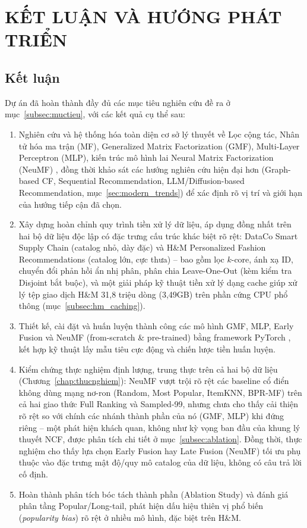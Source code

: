 \chapter{KẾT LUẬN VÀ HƯỚNG PHÁT TRIỂN}
\label{chap:ketluan}

\section{Kết luận}
\label{sec:ketluan}

Dự án đã hoàn thành đầy đủ các mục tiêu nghiên cứu đề ra ở mục~\ref{subsec:muctieu}, với các kết quả cụ thể sau:
\begin{enumerate}
    \item Nghiên cứu và hệ thống hóa toàn diện cơ sở lý thuyết về Lọc cộng tác, Nhân tử hóa ma trận (MF), Generalized Matrix Factorization (GMF), Multi-Layer Perceptron (MLP), kiến trúc mô hình lai Neural Matrix Factorization (NeuMF) \parencite{he2017ncf, koren2009matrix}, đồng thời khảo sát các hướng nghiên cứu hiện đại hơn (Graph-based CF, Sequential Recommendation, LLM/Diffusion-based Recommendation, mục~\ref{sec:modern_trends}) để xác định rõ vị trí và giới hạn của hướng tiếp cận đã chọn.
    \item Xây dựng hoàn chỉnh quy trình tiền xử lý dữ liệu, áp dụng đồng nhất trên hai bộ dữ liệu độc lập có đặc trưng cấu trúc khác biệt rõ rệt: DataCo Smart Supply Chain \parencite{dataco2019} (catalog nhỏ, dày đặc) và H\&M Personalized Fashion Recommendations (catalog lớn, cực thưa) -- bao gồm lọc $k$-core, ánh xạ ID, chuyển đổi phản hồi ẩn nhị phân, phân chia Leave-One-Out (kèm kiểm tra Disjoint bắt buộc), và một giải pháp kỹ thuật tiền xử lý dạng cache giúp xử lý tệp giao dịch H\&M 31,8 triệu dòng (3,49GB) trên phần cứng CPU phổ thông (mục~\ref{subsec:hm_caching}).
    \item Thiết kế, cài đặt và huấn luyện thành công các mô hình GMF, MLP, Early Fusion và NeuMF (from-scratch \& pre-trained) bằng framework PyTorch \parencite{paszke2019pytorch}, kết hợp kỹ thuật lấy mẫu tiêu cực động và chiến lược tiền huấn luyện.
    \item Kiểm chứng thực nghiệm định lượng, trung thực trên cả hai bộ dữ liệu (Chương~\ref{chap:thucnghiem}): NeuMF vượt trội rõ rệt các baseline cổ điển không dùng mạng nơ-ron (Random, Most Popular, ItemKNN, BPR-MF) trên cả hai giao thức Full Ranking và Sampled-99, nhưng chưa cho thấy cải thiện rõ rệt so với chính các nhánh thành phần của nó (GMF, MLP) khi đứng riêng -- một phát hiện khách quan, không như kỳ vọng ban đầu của khung lý thuyết NCF, được phân tích chi tiết ở mục~\ref{subsec:ablation}. Đồng thời, thực nghiệm cho thấy lựa chọn Early Fusion hay Late Fusion (NeuMF) tối ưu phụ thuộc vào đặc trưng mật độ/quy mô catalog của dữ liệu, không có câu trả lời cố định.
    \item Hoàn thành phân tích bóc tách thành phần (Ablation Study) và đánh giá phân tầng Popular/Long-tail, phát hiện dấu hiệu thiên vị phổ biến (\textit{popularity bias}) rõ rệt ở nhiều mô hình, đặc biệt trên H\&M.
\end{enumerate}

